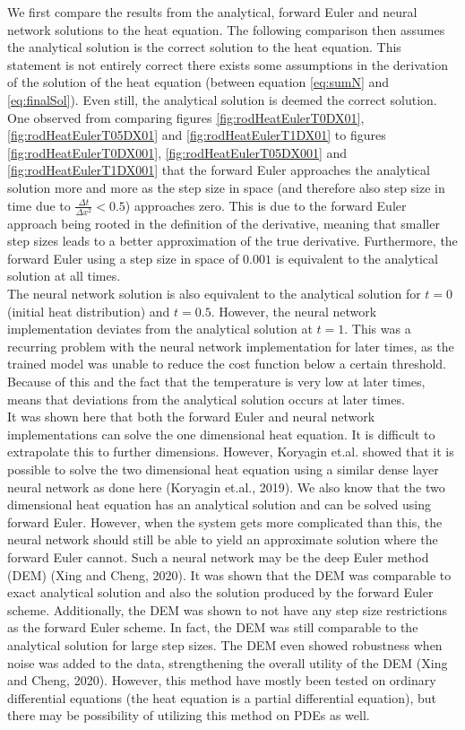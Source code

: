 \documentclass[12pt,a4paper]{article}
\begin{document}
\noindent We first compare the results from the analytical, forward Euler and neural network solutions to the heat equation. The following comparison then assumes the analytical solution is the correct solution to the heat equation. This statement is not entirely correct there exists some assumptions in the derivation of the solution of the heat equation (between equation \ref{eq:sumN} and \ref{eq:finalSol}). Even still, the analytical solution is deemed the correct solution. 
\\
One observed from comparing figures \ref{fig:rodHeatEulerT0DX01}, \ref{fig:rodHeatEulerT05DX01} and \ref{fig:rodHeatEulerT1DX01} to figures \ref{fig:rodHeatEulerT0DX001}, \ref{fig:rodHeatEulerT05DX001} and \ref{fig:rodHeatEulerT1DX001} that the forward Euler approaches the analytical solution more and more as the step size in space (and therefore also step size in time due to $\frac{\Delta t}{\Delta x^2} < 0.5$) approaches zero. This is due to the forward Euler approach being rooted in the definition of the derivative, meaning that smaller step sizes leads to a better approximation of the true derivative. Furthermore, the forward Euler using a step size in space of $0.001$ is equivalent to the analytical solution at all times.
\\
The neural network solution is also equivalent to the analytical solution for $t = 0$ (initial heat distribution) and $t = 0.5$. However, the neural network implementation deviates from the analytical solution at $t = 1$. This was a recurring problem with the neural network implementation for later times, as the trained model was unable to reduce the cost function below a certain threshold. Because of this and the fact that the temperature is very low at later times, means that deviations from the analytical solution occurs at later times.
\\
It was shown here that both the forward Euler and neural network implementations can solve the one dimensional heat equation. It is difficult to extrapolate this to further dimensions. However, Koryagin et.al. showed that it is possible to solve the two dimensional heat equation using a similar dense layer neural network as done here (Koryagin et.al., 2019). We also know that the two dimensional heat equation has an analytical solution and can be solved using forward Euler. However, when the system gets more complicated than this, the neural network should still be able to yield an approximate solution where the forward Euler cannot. Such a neural network may be the deep Euler method (DEM) (Xing and Cheng, 2020). It was shown that the DEM was comparable to exact analytical solution and also the solution produced by the forward Euler scheme. Additionally, the DEM was shown to not have any step size restrictions as the forward Euler scheme. In fact, the DEM was still comparable to the analytical solution for large step sizes. The DEM even showed robustness when noise was added to the data, strengthening the overall utility of the DEM (Xing and Cheng, 2020). However, this method have mostly been tested on ordinary differential equations (the heat equation is a partial differential equation), but there may be possibility of utilizing this method on PDEs as well. 
\end{document}
